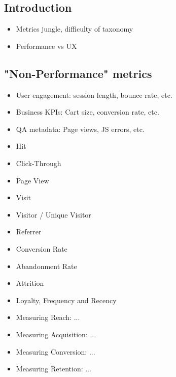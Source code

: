 \subsection{Introduction}

\begin{itemize}
\item Metrics jungle, difficulty of taxonomy
\item Performance vs UX
\end{itemize}










\subsection{"Non-Performance" metrics}

\begin{itemize}
\item User engagement: session length, bounce rate, etc.
\item Business KPIs: Cart size, conversion rate, etc.
\item QA metadata: Page views, JS errors, etc.
\end{itemize}



\begin{itemize}
\item Hit
\item Click-Through
\item Page View
\item Visit
\item Visitor / Unique Visitor
\item Referrer
\item Conversion Rate
\item Abandonment Rate
\item Attrition
\item Loyalty, Frequency and Recency
\item Measuring Reach: ...
\item Measuring Acquisition: ...
\item Measuring Conversion: ...
\item Measuring Retention: ...
\end{itemize}


